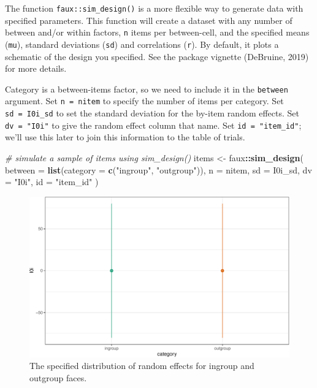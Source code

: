 \documentclass[doc,floatsintext]{apa6}
\newenvironment{Shaded}{\begin{snugshade}}{\end{snugshade}}
\newcommand{\CommentTok}[1]{\textcolor[rgb]{0.56,0.35,0.01}{\textit{#1}}}
\newcommand{\DataTypeTok}[1]{\textcolor[rgb]{0.13,0.29,0.53}{#1}}
\newcommand{\KeywordTok}[1]{\textcolor[rgb]{0.13,0.29,0.53}{\textbf{#1}}}
\newcommand{\NormalTok}[1]{#1}
\newcommand{\OperatorTok}[1]{\textcolor[rgb]{0.81,0.36,0.00}{\textbf{#1}}}
\newcommand{\StringTok}[1]{\textcolor[rgb]{0.31,0.60,0.02}{#1}}
\begin{document}
The function \texttt{faux::sim\_design()} is a more flexible way to generate data with specified parameters. This function will create a dataset with any number of between and/or within factors, \texttt{n} items per between-cell, and the specified means (\texttt{mu}), standard deviations (\texttt{sd}) and correlations (\texttt{r}). By default, it plots a schematic of the design you specified. See the package vignette (DeBruine, 2019) for more details.

Category is a between-items factor, so we need to include it in the \texttt{between} argument. Set \texttt{n\ =\ nitem} to specify the number of items per category. Set \texttt{sd\ =\ I0i\_sd} to set the standard deviation for the by-item random effects. Set \texttt{dv\ =\ "I0i"} to give the random effect column that name. Set \texttt{id\ =\ "item\_id"}; we'll use this later to join this information to the table of trials.

\begin{Shaded}
\begin{Highlighting}[]
\CommentTok{# simulate a sample of items using sim_design()}
\NormalTok{items <-}\StringTok{ }\NormalTok{faux}\OperatorTok{::}\KeywordTok{sim_design}\NormalTok{(}
  \DataTypeTok{between =} \KeywordTok{list}\NormalTok{(}\DataTypeTok{category =} \KeywordTok{c}\NormalTok{(}\StringTok{"ingroup"}\NormalTok{, }\StringTok{"outgroup"}\NormalTok{)),}
  \DataTypeTok{n =}\NormalTok{ nitem,}
  \DataTypeTok{sd =}\NormalTok{ I0i_sd,}
  \DataTypeTok{dv =} \StringTok{"I0i"}\NormalTok{,}
  \DataTypeTok{id =} \StringTok{"item_id"}
\NormalTok{)}
\end{Highlighting}
\end{Shaded}

\begin{figure}

{\centering \includegraphics[width=0.75\linewidth]{images/sim-items-1} 

}

\caption{The specified distribution of random effects for ingroup and outgroup faces.}\label{fig:sim-items}
\end{figure}
\end{document}
